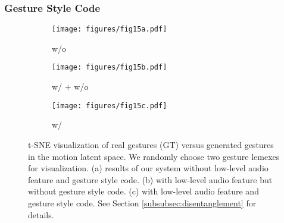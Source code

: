 \documentclass[acmtog,authorversion]{acmart}
\begin{document}
\subsubsection{Gesture Style Code}
\label{subsubsec:gesture_style_code}
\begin{figure}[t]
    \centering
    \begin{subfigure}[t]{0.32\linewidth}
        \centering
        \texttt{[image: figures/fig15a.pdf]}
        \caption{w/o }
        \label{fig:fig15a}
    \end{subfigure} 
    \hspace{\fill}
    \begin{subfigure}[t]{0.32\linewidth}
        \centering
        \texttt{[image: figures/fig15b.pdf]}
        \caption{w/  + w/o }
        \label{fig:fig15b}
    \end{subfigure} 
    \hspace{\fill}
    \begin{subfigure}[t]{0.32\linewidth}
        \centering
        \texttt{[image: figures/fig15c.pdf]}
        \caption{w/ }
        \label{fig:fig15c}
    \end{subfigure} 
    \caption{t-SNE visualization of real gestures (GT) versus generated gestures in the motion latent space. We randomly choose two gesture lemexes for visualization.
    (a) results of our system without low-level audio feature and gesture style code.
    (b) with low-level audio feature but without gesture style code.
    (c) with low-level audio feature and gesture style code.
    See Section \ref{subsubsec:disentanglement} for details.}
    \label{fig:fig15}
    \Description{}
\end{figure}
\end{document}
